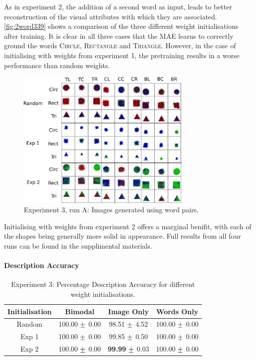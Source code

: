 As in experiment 2, the addition of a second word as input, leads to better reconstruction of the visual attributes with which they are associated. \autoref{fig:2word339} shows a comparison of the three different weight initialisations after training. It is clear in all three cases that the MAE learns to correctly ground the words \textsc{Circle}, \textsc{Rectangle} and \textsc{Triangle}. However, in the case of initialising with weights from experiment 1, the pretraining results in a worse performance than random weights.
\begin{figure}[h]
\centering
\includegraphics[width=0.75\textwidth]{Figs/shapes/2word339_pos.png}
\caption{Experiment 3, run A: Images generated using word pairs.}
\label{fig:2word339}
\end{figure}

Initialising with weights from experiment 2 offers a marginal benifit, with each of the shapes being generally more solid in appearance. Full results from all four runs can be found in the supplimental materials.

\paragraph{Description Accuracy}

\begin{table}[h!]
\centering
	\begin{tabular}{|c|c|c|c|}
	\hline
	\textbf{Initialisation} & 	\textbf{Bimodal} & 	\textbf{Image Only} 	& 	\textbf{Words Only} \\ \hline
	Random	&	100.00	$\mypm$	0.00	&	98.51	$\mypm$	4.52	&	100.00	$\mypm$	0.00	\\ \hline
	Exp 1	&	100.00	$\mypm$	0.00	&	99.85	$\mypm$	0.50	&	100.00	$\mypm$	0.00	\\ \hline
	Exp 2	&	100.00	$\mypm$	0.00	&	\textbf{99.99}	$\mypm$ 0.03	&	100.00	$\mypm$	0.00	\\ \hline



	\end{tabular}
\caption{Experiment 3: Percentage Description Accuracy for different weight initialisations. }
\label{tab:res339_acc}
\end{table}

